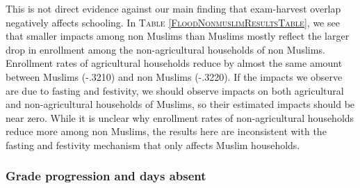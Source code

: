 This is not direct evidence against our main finding that exam-harvest overlap negatively affects schooling. In \textsc{\footnotesize Table \ref{FloodNonmuslimResultsTable}}, we see that smaller impacts among non Muslims than Muslims mostly reflect the larger drop in enrollment among the non-agricultural households of non Muslims. Enrollment rates of agricultural households reduce by almost the same amount between Muslims (-.3210) and non Muslims (-.3220). If the impacts we observe are due to fasting and festivity, we should observe impacts on both agricultural and non-agricultural households of Muslims, so their estimated impacts should be near zero. While it is unclear why enrollment rates of non-agricultural households reduce more among non Muslims, the results here are inconsistent with the fasting and festivity mechanism that only affects Muslim households.

\subsubsection{Grade progression and days absent}



